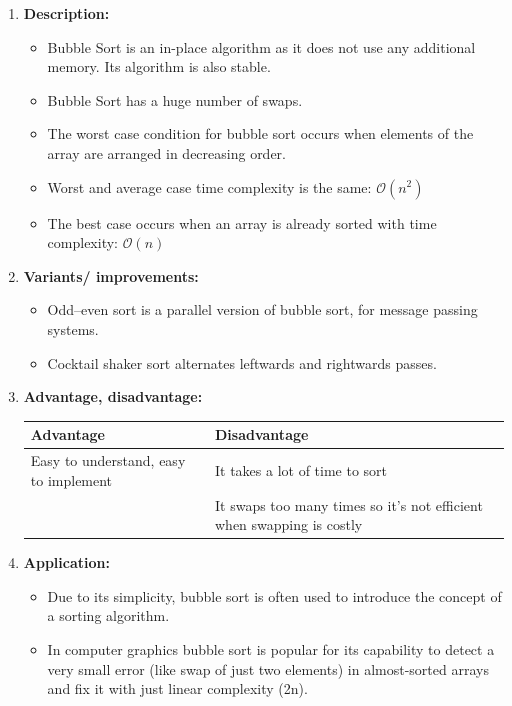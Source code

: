 \documentclass[11pt,a4paper]{article}
\begin{document}
{\begin{enumerate}[label=\textbf{\arabic*})]
				\item \textbf{Description:}
						\begin{itemize}
							\item Bubble Sort is an in-place algorithm as it does not use any additional memory. Its algorithm is also stable.
							\item Bubble Sort has a huge number of swaps.
							\item The worst case condition for bubble sort occurs when elements of the array are arranged in decreasing order.
							\item Worst and average case time complexity is the same: $\mathcal{O}(n^2)$
							\item The best case occurs when an array is already sorted with time complexity: $\mathcal{O}(n)$
						\end{itemize}
				\item \textbf{Variants/ improvements:}
					\begin{itemize}
						\item Odd–even sort is a parallel version of bubble sort, for message passing systems.
						\item Cocktail shaker sort alternates leftwards and rightwards passes.
					\end{itemize}
				\item \textbf{Advantage, disadvantage:}
					\begin{table}[H]
						\centering
						\begin{tabular}{|p{8cm}|p{8cm}|}
							\hline
							\textbf{Advantage} & \textbf{Disadvantage} \\
							\hline
							\hline
							Easy to understand, easy to implement & It takes a lot of time to sort \\[12pt]
							& It swaps too many times so it’s not efficient when swapping is costly\\
							\hline
						\end{tabular}
					\end{table}
				\item \textbf{Application:}	
					\begin{itemize}
						\item Due to its simplicity, bubble sort is often used to introduce the concept of a sorting algorithm.
						\item In computer graphics bubble sort is popular for its capability to detect a very small error (like swap of just two elements) in almost-sorted arrays and fix it with just linear complexity (2n).
					\end{itemize}
			\end{enumerate}
		
}
\end{document}
